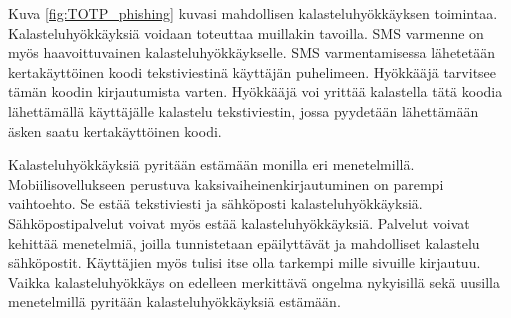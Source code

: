 Kuva \ref{fig:TOTP_phishing} kuvasi mahdollisen kalasteluhyökkäyksen toimintaa. Kalasteluhyökkäyksiä voidaan toteuttaa muillakin tavoilla. SMS varmenne on myös haavoittuvainen kalasteluhyökkäykselle. SMS varmentamisessa lähetetään kertakäyttöinen koodi tekstiviestinä käyttäjän puhelimeen. Hyökkääjä tarvitsee tämän koodin kirjautumista varten. Hyökkääjä voi yrittää kalastella tätä koodia lähettämällä käyttäjälle kalastelu tekstiviestin, jossa pyydetään lähettämään äsken saatu kertakäyttöinen koodi. \citep{google_transparency_report} 

Kalasteluhyökkäyksiä pyritään estämään monilla eri menetelmillä. Mobiilisovellukseen perustuva kaksivaiheinenkirjautuminen on parempi vaihtoehto. Se estää tekstiviesti ja sähköposti kalasteluhyökkäyksiä. Sähköpostipalvelut voivat myös estää kalasteluhyökkäyksiä. Palvelut voivat kehittää menetelmiä, joilla tunnistetaan epäilyttävät ja mahdolliset kalastelu sähköpostit. Käyttäjien myös tulisi itse olla tarkempi mille sivuille kirjautuu. Vaikka kalasteluhyökkäys on edelleen merkittävä ongelma nykyisillä sekä uusilla menetelmillä pyritään kalasteluhyökkäyksiä estämään. \citep{google_transparency_report}  



